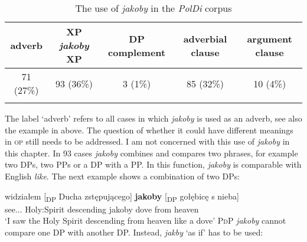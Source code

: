 \documentclass[output=paper
,modfonts
,nonflat]{langsci/langscibook}
\begin{document}
\begin{table}[h]  \begin{tabular}{ccccc} 
 \lsptoprule
adverb & XP \emph{jakoby} XP & DP complement  & \newline adverbial clause & argument clause \\
\midrule
 71 (27\%) & 93 (36\%) & 3 (1\%) & 85 (32\%) & 10 (4\%)  \\
 \lspbottomrule
\end{tabular}
\caption{The use of \emph{jakoby} in the \emph{PolDi} corpus} \label{staropolski_statystka}
\end{table}

\noindent The label `adverb' refers to all cases in which \emph{jakoby} is used as an adverb, see also the example in  above. The question of whether it could have different meanings in \textsc{op} still needs to be addressed. I am not concerned with this use of \emph{jakoby} in this chapter. In 93 cases \emph{jakoby} combines and compares two phrases, for example two DPs, two PPs or a DP with a PP. In this function, \emph{jakoby} is comparable with English \emph{like}. The next example shows a combination of two DPs: 

\ea \gll widziałem [\textsubscript{DP} Ducha zstępującego] \textbf{jakoby} [\textsubscript{DP} gołębicę s nieba] \label{pingwin} \\
		see.{\lptcp}.{\masc}.{\firstperson}{\sg} {} {Holy:Spirit} descending jakoby {} dove from heaven \\
\glt	`I saw the Holy Spirit descending from heaven like a dove' 	
\z
\textsc{PdP} \emph{jakoby} cannot compare one DP with another DP. Instead, \emph{jakby} `as if' has to be used:
\end{document}
